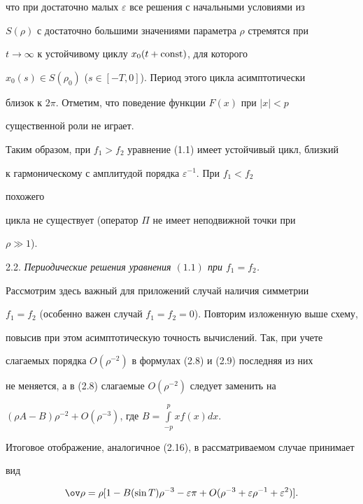 что при достаточно малых $\varepsilon$ все решения с начальными условиями из


$S(\rho)$ с достаточно большими значениями параметра $\rho$ стремятся при


$t\to\infty$ к устойчивому циклу $x_0(t+\operatorname{const})$, для которого


$x_0(s)\in S(\rho_0)$ ($s\in[-T,0]$). Период этого цикла асимптотически


близок к $2\pi$. Отметим, что поведение функции $F(x)$ при $|x|<p$


существенной роли не играет.





Таким образом, при $f_1>f_2$ уравнение (1.1) имеет устойчивый цикл, близкий


к гармоническому с амплитудой порядка $\varepsilon^{-1}$. При $f_1<f_2$


похожего


цикла не существует (оператор $\Pi$ не имеет неподвижной точки при


$\rho\gg1$).


\medskip





2.2. {\it Периодические решения уравнения $(1.1)$ при $f_1=f_2$.}


Рассмотрим здесь важный для приложений \cite{3} случай наличия симметрии


$f_1=f_2$ (особенно важен случай $f_1=f_2=0$). Повторим изложенную выше схему,


повысив при этом асимптотическую точность вычислений. Так, при учете


слагаемых порядка $O(\rho^{-2})$ в формулах (2.8) и (2.9) последняя из них


не меняется, а в (2.8) слагаемые $O(\rho^{-2})$ следует заменить на


$(\rho A-B)\rho^{-2}+O(\rho^{-3})$, где $B=\int\limits_{-p}^p xf(x)dx$.


Итоговое отображение, аналогичное (2.16), в рассматриваемом случае принимает


вид


\begin{equation}


\ov\rho=\rho[1-B(\sin T)\rho^{-3}-\varepsilon\pi+O(\rho^{-3}+\varepsilon\rho^{-1}


+\varepsilon^2)].


\end{equation}


